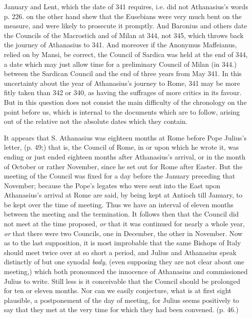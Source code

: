January and Lent, which the date of 341 requires, i.e. did not
Athanasius's words p. 226. on the other hand shew that the Eusebians
were very much bent on the measure, and were likely to prosecute it
promptly. And Baronius and others date the Councils of the Macrostich
and of Milan at 344, not 345, which throws back the journey of
Athanasius to 341. And moreover if the Anonymus Maffeianus, relied on
by Mansi, be correct, the Council of Sardica was held at the end of
344, a date which may just allow time for a preliminary Council of
Milan (in 344.) between the Sardican Council and the end of three
years from May 341. In this uncertainty about the year of Athanasius's
journey to Rome, 341 may be more fitly taken than 342 or 340, as
having the suffrages of more critics in its favour. But in this
question does not consist the main difficulty of the chronology on the
point before us, which is internal to the documents which are to
follow, arising out of the relative not the absolute dates which they
contain.

It appears that S. Athanasius
was eighteen months at Rome before Pope Julius's letter, (p. 49;) that
is, the Council of Rome, in or upon which he wrote it, was ending or
just ended eighteen months after Athanasius's arrival, or in the month
of October or rather November, since he set out for Rome after Easter.
But the meeting of the Council was fixed for a day before the January
preceding that November; because the Pope's legates who were sent into
the East upon Athanasius's arrival at Rome are said, by being kept at
Antioch till January, to be kept over the time of meeting. Thus
we have an interval of eleven months between the meeting and the
termination. It follows then that the Council did not meet at the time
proposed, \emph{or} that it was continued for nearly a whole year, \emph{or}
that there were two Councils, one in December, the other in November.
Now as to the last supposition, it is most improbable that the same
Bishops of Italy should meet twice over at so short a period, and
Julius and Athanasius speak distinctly of but one synodal \emph{body},
(even supposing they are not clear about one meeting,) which both
pronounced the innocence of Athanasius and commissioned Julius to
write. Still less is it conceivable that the Council should be
prolonged for ten or eleven months. Nor can we easily conjecture, what
is at first sight plausible, a postponement of the day of meeting, for
Julius seems positively to say that they met at the very time for
which they had been convened. (p. 46.)

